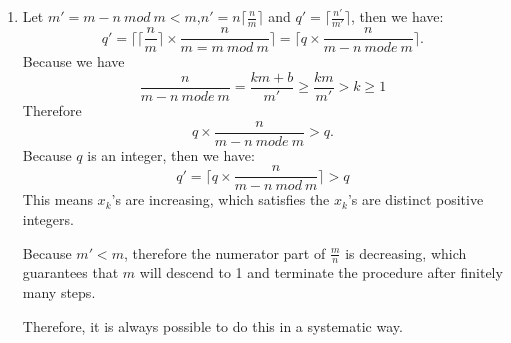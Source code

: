 \documentclass[12pt,a4paper]{article}
\makeatletter
\newtheorem*{solution}{Solution}
\theoremstyle{definition}
\renewenvironment{solution}[1][Solution] {\par\pushQED{\qed}\normalfont\topsep6\p@\@plus6\p@\relax\trivlist\item[\hskip\labelsep\bfseries#1\@addpunct{.}]\ignorespaces}{\popQED\endtrivlist\@endpefalse} \makeatother
\makeatother
\begin{document}
\begin{enumerate}
\begin{solution}
        	
        	Let $m'=m-n\ mod\ m<m$,$n'=n\lceil \frac{n}{m}\rceil$ and $q'=\lceil \frac{n'}{m'} \rceil$, then we have:
        	\begin{equation*}
        	    q'=\lceil\lceil\frac{n}{m}\rceil\times\frac{n}{m=m\ mod\ m}\rceil=\lceil q\times\frac{n}{m-n\ mode\ m}\rceil.
        	\end{equation*}
            Because we have
            \begin{equation*}
            	\frac{n}{m-n\ mode\ m}=\frac{km+b}{m'}\ge\frac{km}{m'}>k\ge 1
            \end{equation*}
            Therefore
        	\begin{equation*}
        	    q\times\frac{n}{m-n\ mode\ m}>q.
        	\end{equation*}
        	Because $q$ is an integer, then we have:
        	\begin{equation*}
        	    q'=\lceil q\times\frac{n}{m-n\ mod\ m}\rceil>q
        	\end{equation*}
        	This means $x_k$'s are increasing, which satisfies the $x_k$'s are distinct positive integers.
        	
        	Because $m'<m$, therefore the numerator part of $\frac{m}{n}$ is decreasing, which guarantees that $m$ will descend to 1 and terminate the procedure after finitely many steps.
        	
        	Therefore, it is always possible to do this in a systematic way.
        	

\end{solution}
\end{enumerate}
\end{document}
